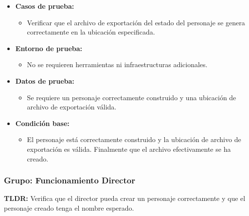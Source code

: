 \documentclass{article}
\begin{document}
\begin{itemize}
	\item \textbf{Casos de prueba:}
	\begin{itemize}
		\item Verificar que el archivo de exportación del estado del personaje se genera correctamente en la ubicación especificada.
	\end{itemize}
	
	\item \textbf{Entorno de prueba:}
	\begin{itemize}
		\item No se requieren herramientas ni infraestructuras adicionales.
	\end{itemize}
	
	\item \textbf{Datos de prueba:}
	\begin{itemize}
		\item Se requiere un personaje correctamente construido y una ubicación de archivo de exportación válida.
	\end{itemize}
	
	\item \textbf{Condición base:}
	\begin{itemize}
		\item El personaje está correctamente construido y la ubicación de archivo de exportación es válida. Finalmente que el archivo efectivamente se ha creado.
	\end{itemize}
\end{itemize}



\subsubsection{Grupo: Funcionamiento Director}
\textbf{TLDR:} Verifica que el director pueda crear un personaje correctamente y que el personaje creado tenga el nombre esperado.
\end{document}

